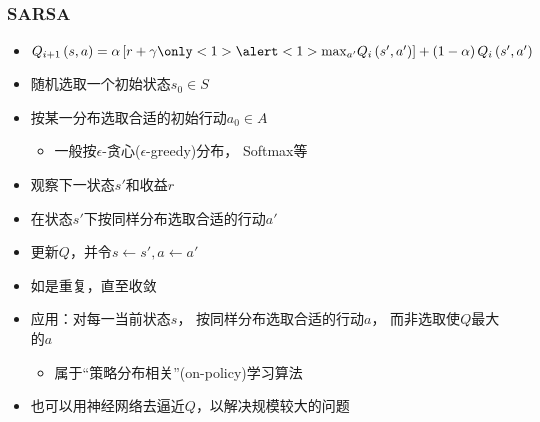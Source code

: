 \documentclass[10pt,CJK]{beamer}
\begin{document}
	\begin{frame}
		\frametitle{SARSA\only<10>{-Network}}
		\begin{itemize}
			\item $
			Q_{i+1}\left(s,a\right)=
			\alpha\left[
			r+\gamma\only<1>{\alert<1>{\max_{a'}}}
			Q_i\left(s',a'\right)
			\right]+
			\left(1-\alpha\right)Q_i\left(s',a'\right)
			$\pause\pause
			\item 随机选取一个初始状态$s_0\in S$\pause
			\item\alert<4>{按某一分布选取合适的初始行动$a_0\in A$}
			\begin{itemize}
				\item 一般按$\epsilon$-贪心($\epsilon$-greedy)分布，
				Softmax等
			\end{itemize}\pause
			\item 观察下一状态$s'$和收益$r$\pause
			\item\alert<6>{在状态$s'$下按同样分布选取合适的行动$a'$}\pause
			\item 更新$Q$，\alert<7>{并令$s\gets s',a\gets a'$}\pause
			\item 如是重复，直至收敛\pause
			\item 应用：对每一当前状态$s$，
			\alert<9>{按同样分布选取合适的行动$a$}，
			而非选取使$Q$最大的$a$
			\begin{itemize}
				\item 属于“策略分布相关”(on-policy)学习算法
			\end{itemize}\pause
			\item 也可以用神经网络去逼近$Q$，以解决规模较大的问题
		\end{itemize}
	\end{frame}
	
\end{document}

